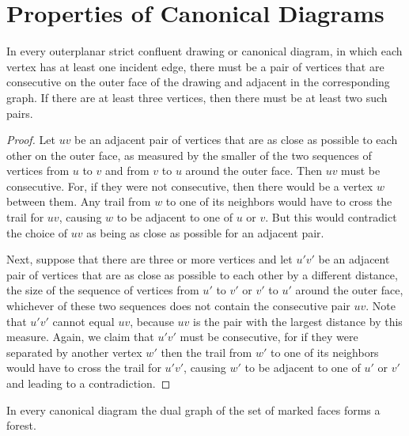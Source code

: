 \documentclass{llncs}
\begin{document}
\section{Properties of Canonical Diagrams} \label {app:canonical}

\begin{lemma}
\label{lem:consecutive}
In every outerplanar strict confluent drawing or canonical diagram, in which each vertex has at least one incident edge, there must be a pair of  vertices that are consecutive on the outer face of the drawing and adjacent in the corresponding graph. If there are at least three vertices, then there must be at least two such pairs.
\end{lemma}

\begin{proof}
Let $uv$ be an adjacent pair of vertices that are as close as possible to each other on the outer face, as measured by the smaller of the two sequences of vertices from $u$ to $v$ and from $v$ to $u$ around the outer face.
Then $uv$ must be consecutive. For, if they were not consecutive, then there would be a vertex $w$ between them.  Any trail from $w$ to one of its neighbors would have to cross the trail for $uv$, causing $w$ to be adjacent to one of $u$ or $v$. But this would contradict the choice of $uv$ as being as close as possible for an adjacent pair.

Next, suppose that there are three or more vertices and let $u'v'$ be an adjacent pair of vertices that are as close as possible to each other by a different distance, the size of the sequence of vertices from $u'$ to $v'$ or $v'$ to $u'$ around the outer face, whichever of these two sequences does not contain the consecutive pair $uv$. Note that $u'v'$ cannot equal $uv$, because $uv$ is the pair with the largest distance by this measure. Again, we claim that $u'v'$ must be consecutive, for if they were separated by another vertex $w'$ then the trail from $w'$ to one of its neighbors would have to cross the trail for $u'v'$, causing $w'$ to be adjacent to one of $u'$ or $v'$ and leading to a contradiction.
\end{proof}

\begin{lemma}
\label{lem:marked-tree}
In every canonical diagram the dual graph of the set of marked faces forms a forest.
\end{lemma}
\end{document}
